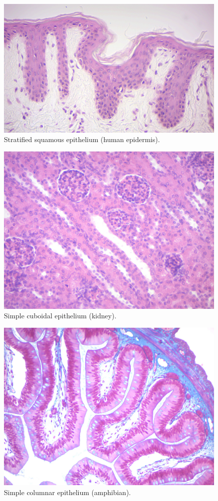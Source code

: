 \begin{figure}

{\centering \includegraphics[width=0.7\linewidth]{./figures/tissues/stratified_squamous}

}

\caption{Stratified squamous epithelium (human epidermis).}\label{fig:stratifiedsquamous}
\end{figure}

\begin{figure}

{\centering \includegraphics[width=0.7\linewidth]{./figures/tissues/simple_cuboidal}

}

\caption{Simple cuboidal epithelium (kidney).}\label{fig:cuboidal}
\end{figure}

\begin{figure}

{\centering \includegraphics[width=0.7\linewidth]{./figures/tissues/simple_columnar}

}

\caption{Simple columnar epithelium (amphibian).}\label{fig:columnar}
\end{figure}

